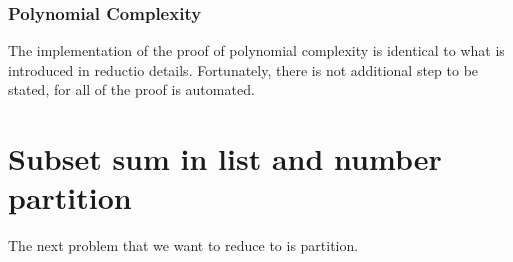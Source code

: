 \subsubsection{Polynomial Complexity}
The implementation of the proof of polynomial complexity is identical to what is introduced in reductio details. Fortunately, 
there is not additional step to be stated, for all of the proof is automated. 

\section{Subset sum in list and number partition}
The next problem that we want to reduce to is partition.

